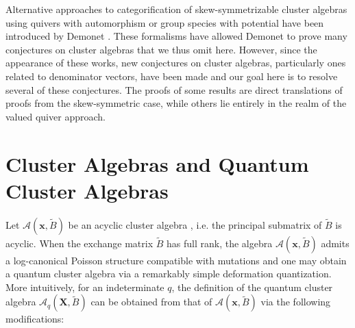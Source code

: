 \documentclass[12pt]{amsart}
\newcommand{\bfx}{\mathbf{x}}
\newcommand{\bfX}{\mathbf{X}}
\newcommand{\cA}{\mathcal{A}}
\begin{document}
  Alternative approaches to categorification of skew-symmetrizable cluster algebras using quivers with automorphism or group species with potential have been introduced by Demonet \cite{demonet1,demonet2}.
  These formalisms have allowed Demonet to prove many conjectures on cluster algebras that we thus omit here.
  However, since the appearance of these works, new conjectures on cluster algebras, particularly ones related to denominator vectors, have been made and our goal here is to resolve several of these conjectures.
  The proofs of some results are direct translations of proofs from the skew-symmetric case, while others lie entirely in the realm of the valued quiver approach.

  \section{Cluster  Algebras and Quantum Cluster Algebras} Let $\cA(\bfx,\tilde B)$ be an acyclic cluster algebra \cite{berenstein-fomin-zelevinsky}, i.e. the principal submatrix of $\tilde B$ is acyclic.  
  When the exchange matrix $\tilde B$ has full rank, the algebra $\cA(\bfx,\tilde B)$ admits a log-canonical Poisson structure compatible with mutations \cite{gekhtman-shapiro-vainshtein} and one may obtain a quantum cluster algebra via a remarkably simple deformation quantization.  
  More intuitively, for an indeterminate $q$, the definition of the quantum cluster algebra $\cA_q(\bfX,\tilde B)$ can be obtained from that of $\cA(\bfx,\tilde B)$ via the following modifications:
\end{document}

